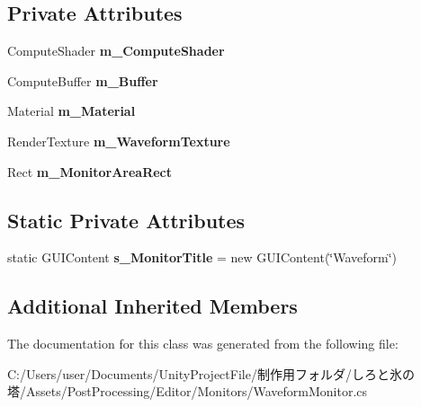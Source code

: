 \subsection*{Private Attributes}
\begin{DoxyCompactItemize}
\item 
\mbox{\label{class_unity_editor_1_1_post_processing_1_1_waveform_monitor_a4ca7acb5938bcd29c15a37de0191df15}} 
Compute\+Shader {\bfseries m\+\_\+\+Compute\+Shader}
\item 
\mbox{\label{class_unity_editor_1_1_post_processing_1_1_waveform_monitor_a9d823eab4cb62b2123b6c4dfef6d807d}} 
Compute\+Buffer {\bfseries m\+\_\+\+Buffer}
\item 
\mbox{\label{class_unity_editor_1_1_post_processing_1_1_waveform_monitor_a1a9f1c35aba50fdd8a9a31e8d466e045}} 
Material {\bfseries m\+\_\+\+Material}
\item 
\mbox{\label{class_unity_editor_1_1_post_processing_1_1_waveform_monitor_a7733558bc710c34093065f431fa3bde2}} 
Render\+Texture {\bfseries m\+\_\+\+Waveform\+Texture}
\item 
\mbox{\label{class_unity_editor_1_1_post_processing_1_1_waveform_monitor_ae0d755a74c2b355f37b18612c072fc75}} 
Rect {\bfseries m\+\_\+\+Monitor\+Area\+Rect}
\end{DoxyCompactItemize}
\subsection*{Static Private Attributes}
\begin{DoxyCompactItemize}
\item 
\mbox{\label{class_unity_editor_1_1_post_processing_1_1_waveform_monitor_a2c4079582d8f390c8aea3bdc570de4d6}} 
static G\+U\+I\+Content {\bfseries s\+\_\+\+Monitor\+Title} = new G\+U\+I\+Content(\char`\"{}Waveform\char`\"{})
\end{DoxyCompactItemize}
\subsection*{Additional Inherited Members}


The documentation for this class was generated from the following file\+:\begin{DoxyCompactItemize}
\item 
C\+:/\+Users/user/\+Documents/\+Unity\+Project\+File/制作用フォルダ/しろと氷の塔/\+Assets/\+Post\+Processing/\+Editor/\+Monitors/Waveform\+Monitor.\+cs\end{DoxyCompactItemize}
